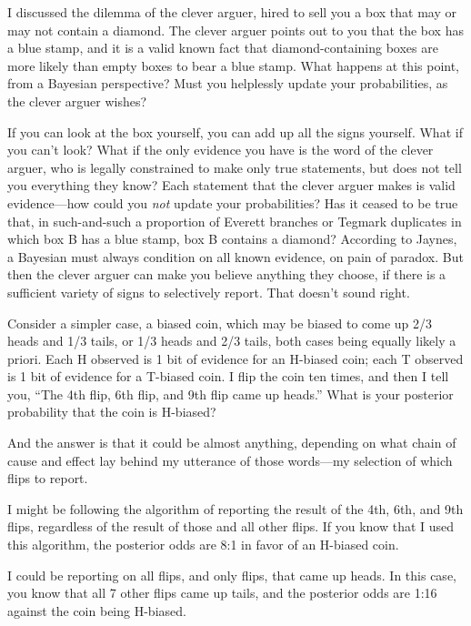 \myendsectiontext


{
 I discussed the dilemma of the clever arguer, hired to sell you a
box that may or may not contain a diamond. The clever arguer points out
to you that the box has a blue stamp, and it is a valid known fact that
diamond-containing boxes are more likely than empty boxes to bear a
blue stamp. What happens at this point, from a Bayesian perspective?
Must you helplessly update your probabilities, as the clever arguer
wishes? }

{
 If you can look at the box yourself, you can add up all the signs
yourself. What if you can't look? What if the only
evidence you have is the word of the clever arguer, who is legally
constrained to make only true statements, but does not tell you
everything they know? Each statement that the clever arguer makes is
valid evidence---how could you \textit{not} update your probabilities?
Has it ceased to be true that, in such-and-such a proportion of Everett
branches or Tegmark duplicates in which box B has a blue stamp, box B
contains a diamond? According to Jaynes, a Bayesian must always
condition on all known evidence, on pain of paradox. But then the
clever arguer can make you believe anything they choose, if there is a
sufficient variety of signs to selectively report. That
doesn't sound right.}

{
 Consider a simpler case, a biased coin, which may be biased to
come up 2/3 heads and 1/3 tails, or 1/3 heads and 2/3 tails, both cases
being equally likely a priori. Each H observed is 1 bit of evidence for
an H-biased coin; each T observed is 1 bit of evidence for a T-biased
coin. I flip the coin ten times, and then I tell you,
``The 4th flip, 6th flip, and 9th flip came up
heads.'' What is your posterior probability that the
coin is H-biased?}

{
 And the answer is that it could be almost anything, depending on
what chain of cause and effect lay behind my utterance of those
words---my selection of which flips to report.}

{
 I might be following the algorithm of reporting the result of the
4th, 6th, and 9th flips, regardless of the result of those and all
other flips. If you know that I used this algorithm, the posterior odds
are 8:1 in favor of an H-biased coin.}

{
 I could be reporting on all flips, and only flips, that came up
heads. In this case, you know that all 7 other flips came up tails, and
the posterior odds are 1:16 against the coin being H-biased.}


